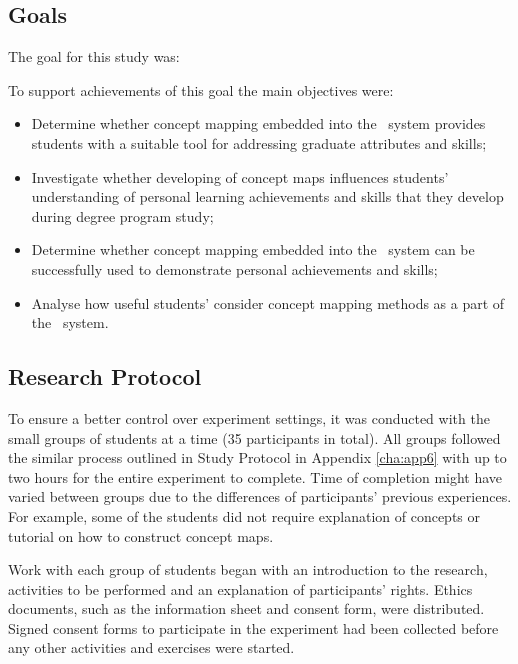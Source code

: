\subsection{Goals}
The goal for this study was:


To support achievements of this goal the main objectives were:

\begin{itemize}
  \item Determine whether concept mapping embedded into the \ep~system provides
  students with a suitable tool for addressing graduate attributes and \LLLs
  skills;
  \item Investigate whether developing of concept maps influences students'
  understanding of personal learning achievements and skills that they develop
  during degree program study;
  \item Determine whether concept mapping embedded into the \ep~system can be
  successfully used to demonstrate personal achievements and skills;
  \item Analyse how useful students' consider concept mapping methods as a part
  of the \ep~system.
\end{itemize}

\subsection{Research Protocol}

To ensure a better control over experiment settings, it was conducted with the
small groups of students at a time (35 participants in total). All groups
followed the similar process outlined in Study Protocol in Appendix
\ref{cha:app6} with up to two hours for the entire experiment to complete. Time
of completion might have varied between groups due to the differences of
participants' previous experiences. For example, some of the students did not
require explanation of \LLLs concepts or tutorial on how to construct concept
maps.

Work with each group of students began with an introduction to the research,
activities to be performed and an explanation of participants' rights.
Ethics documents, such as the information sheet and consent form, were
distributed. Signed consent forms to participate in the experiment had been
collected before any other activities and exercises were started.

